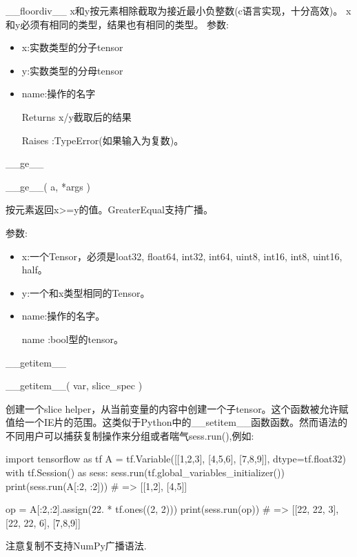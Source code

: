 \_\_floordiv\_\_\newline
x和y按元素相除截取为接近最小负整数(c语言实现，十分高效)。
x和y必须有相同的类型，结果也有相同的类型。
参数:
\begin{itemize}
	\item x:实数类型的分子tensor
	\item y:实数类型的分母tensor
	\item name:操作的名字
	\item[Returns]x/y截取后的结果
	\item[Raises]:TypeError(如果输入为复数)。
\end{itemize}

\_\_ge\_\_\newline
\begin{python}
__ge__(
    a,
    *args
)
\end{python}
按元素返回x>=y的值。GreaterEqual支持广播。

参数:
\begin{itemize}
	\item x:一个Tensor，必须是loat32, float64, int32, int64, uint8, int16, int8, uint16, half。
	\item y:一个和x类型相同的Tensor。
	\item name:操作的名字。
	\item[name]:bool型的tensor。
\end{itemize}

\_\_getitem\_\_\newline
\begin{python}
__getitem__(
    var,
    slice_spec
)
\end{python}
创建一个slice helper，从当前变量的内容中创建一个子tensor。这个函数被允许赋值给一个IE片的范围。这类似于Python中的\_\_setitem\_\_函数函数。然而语法的不同用户可以捕获复制操作来分组或者喘气sess.run(),例如:
\begin{python}
import tensorflow as tf
A = tf.Variable([[1,2,3], [4,5,6], [7,8,9]], dtype=tf.float32)
with tf.Session() as sess:
  sess.run(tf.global_variables_initializer())
  print(sess.run(A[:2, :2]))  # => [[1,2], [4,5]]

  op = A[:2,:2].assign(22. * tf.ones((2, 2)))
  print(sess.run(op))  # => [[22, 22, 3], [22, 22, 6], [7,8,9]]
\end{python}
注意复制不支持NumPy广播语法.


